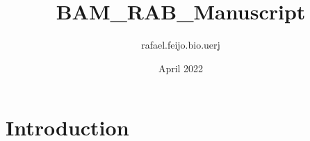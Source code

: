 \documentclass{article}
\title{BAM_RAB_Manuscript}
\author{rafael.feijo.bio.uerj }
\date{April 2022}
\begin{document}
\maketitle

\section{Introduction}
\end{document}

